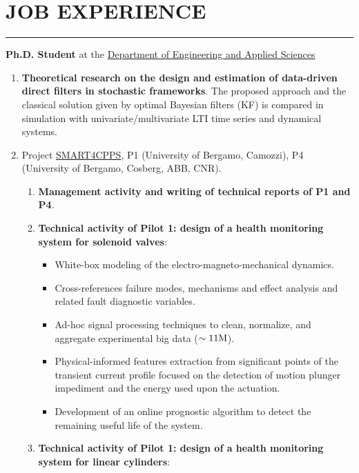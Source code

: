\documentclass[10pt]{article}
\newcommand{\cvsection}[1]{\section*{\centering\normalsize\uppercase{#1}}\vspace{-16pt}\rule{\linewidth}{0.2pt}\vspace{6pt}}
\begin{document}
\cvsection{Job Experience}
\noindent
\begin{minipage}[t]{.80\textwidth}
	\textbf{Ph.D. Student} at the \href{https://disa.unibg.it/}{Department of Engineering and Applied Sciences}
	\begin{enumerate}
		\item \textbf{Theoretical research on the design and estimation of data-driven direct filters in stochastic frameworks}.
		The proposed approach and the classical solution given by optimal Bayesian filters (KF) is compared in simulation with univariate/multivariate LTI time series and dynamical systems.
		\item Project \href{https://www.smart4cpps.it/}{SMART4CPPS}, P1 ({\small University of Bergamo, Camozzi}), P4 ({\small University of Bergamo, Cosberg, ABB, CNR}).
		\begin{enumerate}
			\item \textbf{Management activity and writing of technical reports of P1 and P4}.
			\item \textbf{Technical activity of Pilot 1: design of a health monitoring system for solenoid valves}:
			\begin{itemize}
				\item White-box modeling of the electro-magneto-mechanical dynamics.
				\item Cross-references failure modes, mechanisms and effect analysis and related fault diagnostic variables.
				\item Ad-hoc signal processing techniques to clean, normalize, and aggregate experimental big data ($\sim 11 \textnormal{M}$).
				\item Physical-informed features extraction from significant points of the transient current profile focused on the detection of motion plunger impediment and the energy used upon the actuation.
				\item Development of an online prognostic algorithm to detect the remaining useful life of the system.
			\end{itemize}
			\item \textbf{Technical activity of Pilot 1: design of a health monitoring system for linear cylinders}:

\end{enumerate}
\end{enumerate}
\end{minipage}
\end{document}
